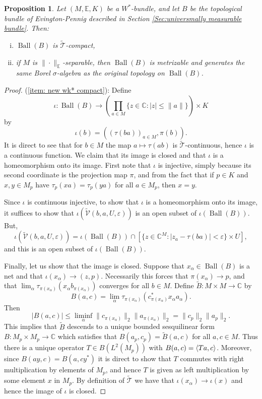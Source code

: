 \documentclass[10pt]{amsart}
\newtheorem{prop}[thm]{Proposition}
\theoremstyle{definition}
\numberwithin{equation}{section}
\newcommand{\bC}{{\mathbb C}}
\newcommand{\bE}{{\mathbb E}}
\newcommand{\cT}{{\mathcal T}}
\DeclareMathOperator{\Ball}{Ball}
\DeclarePairedDelimiter{\ip}{\langle}{\rangle}
\begin{document}
\begin{prop}\label{prop: new topology who dis}
 Let $(M,\bE,K)$ be a $W^{*}$-bundle, and let $B$ be the topological bundle of Evington-Pennig described in Section \ref{Sec:universmally measurable bundle}. Then:
 \begin{enumerate}[(i)]
     \item $\Ball(B)$ is $\widetilde{\cT}$-compact, \label{item: new wk* compact}
     \item if $M$ is $\|\cdot\|_{\bE}$-separable, then $\Ball(B)$ is metrizable and generates the same Borel $\sigma$-algebra as the original topology on $\Ball(B)$. \label{item: same borels}
 \end{enumerate}
\end{prop}
 \begin{proof}
 (\ref{item: new wk* compact}): Define 
 \[\iota\colon \Ball(B)\to \left(\prod_{a\in M}\{z\in \bC:|z|\leq \|a\|\}\right)\times K\]
 by
 \[\iota(b)=((\tau(ba))_{a\in M},\pi(b)).\]
 It is direct to see that for $b\in M$ the map $a\mapsto \tau(ab)$ is $\widetilde{\cT}$-continuous, hence $\iota$ is a continuous function. We claim that its image is closed and that $\iota$ is a homeomorphism onto its image. First note that $\iota$ is injective, simply because its second coordinate is the projection map $\pi$, and from the fact that if $p\in K$ and $x,y\in M_{p}$ have $\tau_{p}(xa)=\tau_{p}(ya)$ for all $a\in M_{p}$, then $x=y$.

Since $\iota$ is  continuous injective, to show that $\iota$ is a homeomorphism onto its image, it suffices to show that $\iota(\widetilde{\mathcal{V}}(b,a,U,\varepsilon))$ is an open subset of $\iota(\Ball(B))$. But,
\[\iota(\widetilde{\mathcal{V}}(b,a,U,\varepsilon))=\iota(\Ball(B))\cap \left[\{z\in \bC^{M}:|z_{a}-\tau(ba)|<\varepsilon\} \times U\right]
,\]
and this is an open subset of $\iota(\Ball(B))$.

Finally, let us show that the image is closed. Suppose that $x_{\alpha}\in\Ball(B)$ is a net and that $\iota(x_{\alpha})\to (z,p)$. Necessarily this forces that $\pi(x_{\alpha})\to p$, and that $\lim_{\alpha}\tau_{\pi(x_{\alpha})}(x_{\alpha}b_{\pi(x_{\alpha})})$ converges for all $b\in M$. Define $\widetilde{B}\colon M\times M\to \bC$ by
\[B(a,c)=\lim_{\alpha}\tau_{\pi(x_{\alpha})}(c_{\pi(x_{\alpha})}^{*}x_{\alpha}a_{\alpha}).\]
Then
\[|B(a,c)|\leq \liminf_{\alpha}\|c_{\pi(x_{\alpha})}\|_{2}\|a_{\pi(x_{\alpha})}\|_{2}=\|c_{p}\|_{2}\|a_{p}\|_{2}.\]
This implies that $\widetilde{B}$ descends to a unique bounded sesquilinear form $B\colon M_{p}\times M_{p}\to \bC$ which satisfies that $B(a_{p},c_{p})=\widetilde{B}(a,c)$ for all $a,c\in M$. Thus there is a unique operator $T\in B(L^{2}(M_{p}))$ with $B(a,c)=\ip{Ta,c}$. Moreover, since $B(ay,c)=B(a,cy^{*})$ it is direct to show that $T$ commutes with right multiplication by elements of $M_{p}$, and hence $T$ is given as left multiplication by some element $x$ in $M_{p}$. By definition of $\widetilde{\cT}$ we have that $\iota(x_{\alpha})\to \iota(x)$  and hence the image of $\iota$ is closed.


\end{proof}
\end{document}
